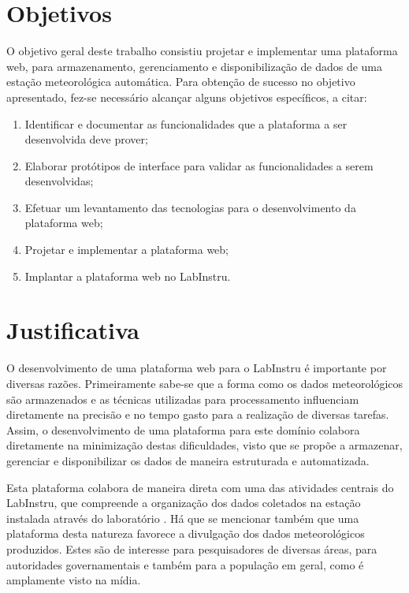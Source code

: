 \section{Objetivos}

O objetivo geral deste trabalho consistiu projetar e implementar uma plataforma web, para armazenamento, gerenciamento e disponibilização de dados de uma estação meteorológica automática. Para obtenção de sucesso no objetivo apresentado, fez-se necessário alcançar alguns objetivos específicos, a citar:

\begin{enumerate}
	\item Identificar e documentar as funcionalidades que a plataforma a ser desenvolvida deve prover;
	\item Elaborar protótipos de interface para validar as funcionalidades a serem desenvolvidas;
	\item Efetuar um levantamento das tecnologias para o desenvolvimento da plataforma web;
	\item Projetar e implementar a plataforma web;
	\item Implantar a plataforma web no LabInstru.
\end{enumerate}

\section{Justificativa}

O desenvolvimento de uma plataforma web para o LabInstru é importante por diversas razões. Primeiramente sabe-se que a forma como os dados meteorológicos são armazenados e as técnicas utilizadas para processamento influenciam diretamente na precisão e no tempo gasto para a realização de diversas tarefas. Assim, o desenvolvimento de uma plataforma para este domínio colabora diretamente na minimização destas dificuldades, visto que se propõe a  armazenar, gerenciar e disponibilizar os dados de maneira estruturada e automatizada.

Esta plataforma colabora de maneira direta com uma das atividades centrais do LabInstru, que compreende a organização dos dados coletados na estação instalada através do laboratório \cite{Labinstru:EST}. Há que se mencionar também que uma plataforma desta natureza favorece a divulgação dos dados meteorológicos produzidos. Estes são de interesse para pesquisadores de diversas áreas, para autoridades governamentais e também para a população em geral, como é amplamente visto na mídia.


